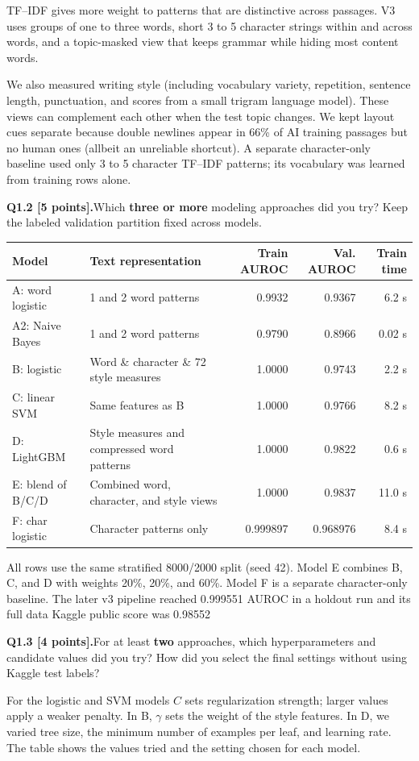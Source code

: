\documentclass[11pt,letterpaper]{article}
\newcommand{\question}[2]{\needspace{4\baselineskip}\par\addvspace{0.45em}\noindent\textbf{#1}\quad #2\par\nobreak\vspace{0.1em}}
\begin{document}
TF--IDF gives more weight to patterns that are distinctive across passages. V3 uses groups of one to three words, short 3 to 5 character strings within and across words, and a topic-masked view that keeps grammar while hiding most content words.
\newline

We also measured writing style (including vocabulary variety, repetition, sentence length, punctuation, and scores from a small trigram language model). These views can complement each other when the test topic changes. We kept layout cues separate because double newlines appear in 66\% of AI training passages but no human ones (allbeit an unreliable shortcut). A separate character-only baseline used only 3 to 5 character TF--IDF patterns; its vocabulary was learned from training rows alone.
\question{Q1.2 [5 points].}{Which \textbf{three or more} modeling approaches did you try? Keep the labeled validation partition fixed across models.}
\begin{tabularx}{\linewidth}{@{}p{1.24in}Yrrr@{}}\toprule
Model & Text representation & Train AUROC & Val. AUROC & Train time \\ \midrule
A: word logistic & 1 and 2 word patterns & 0.9932 & 0.9367 & 6.2 s \\
A2: Naive Bayes & 1 and 2 word patterns & 0.9790 & 0.8966 & 0.02 s \\
B: logistic & Word \& character \& 72 style measures & 1.0000 & 0.9743 & 2.2 s \\
C: linear SVM & Same features as B & 1.0000 & 0.9766 & 8.2 s \\
D: LightGBM & Style measures and compressed word patterns & 1.0000 & 0.9822 & 0.6 s \\
E: blend of B/C/D & Combined word, character, and style views & 1.0000 & 0.9837 & 11.0 s \\
F: char logistic & Character patterns only & 0.999897 & 0.968976 & 8.4 s \\
\bottomrule\end{tabularx}
All rows use the same stratified 8000/2000 split (seed 42). Model E combines B, C, and D with weights 20\%, 20\%, and 60\%. Model F is a separate character-only baseline. The later v3 pipeline reached 0.999551 AUROC in a holdout run and its full data Kaggle public score was 0.98552
\question{Q1.3 [4 points].}{For at least \textbf{two} approaches, which hyperparameters and candidate values did you try? How did you select the final settings without using Kaggle test labels?}
For the logistic and SVM models $C$ sets regularization strength; larger values apply a weaker penalty. In B, $\gamma$ sets the weight of the style features. In D, we varied tree size, the minimum number of examples per leaf, and learning rate. The table shows the values tried and the setting chosen for each model.
\end{document}
